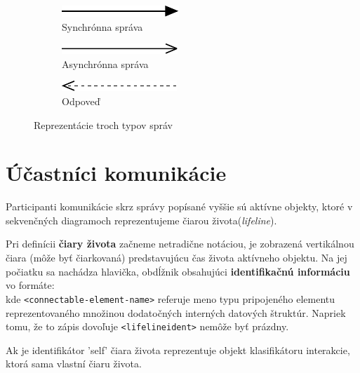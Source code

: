 \begin{figure}[H]
	\centering
	\begin{subfigure}[t]{.3\textwidth}
		\centering
		\includegraphics{obrazky-figures/SD-sync}
		\caption{Synchrónna správa}
	\end{subfigure}
	\begin{subfigure}[t]{.3\textwidth}
		\centering
		\includegraphics{obrazky-figures/SD-async}
		\caption{Asynchrónna správa}
	\end{subfigure}
\begin{subfigure}[t]{.3\textwidth}
	\centering
	\includegraphics{obrazky-figures/SD-reply}
	\caption{Odpoveď}
\end{subfigure}
	\caption{Reprezentácie troch typov správ}
	\label{fig:arrows}
\end{figure}

\section{Účastníci komunikácie}
Participanti komunikácie skrz správy popísané vyššie sú aktívne objekty, ktoré v sekvenčných diagramoch reprezentujeme čiarou života(\emph{lifeline}).

\begin{defn}
	Pri definícii \textbf{čiary života} začneme netradične notáciou, je zobrazená vertikálnou čiara (môže byť čiarkovaná) predstavujúcu čas života aktívneho objektu. Na jej počiatku sa nachádza hlavička, obdĺžnik obsahujúci \textbf{identifikačnú informáciu} vo formáte: \\
	
	kde \lstinline{<connectable-element-name>} referuje meno typu pripojeného elementu reprezentovaného množinou dodatočných interných datových štruktúr. Napriek tomu, že to zápis dovoľuje \lstinline{<lifelineident>} nemôže byť prázdny.
	
	Ak je identifikátor 'self' čiara života reprezentuje objekt klasifikátoru interakcie, ktorá sama vlastní čiaru života.
	
	
\end{defn} 

